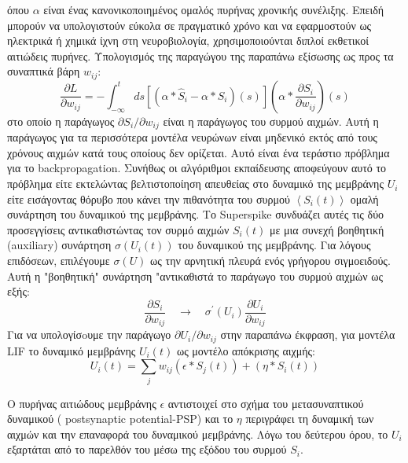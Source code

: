 \documentclass[12pt]{report}
\begin{document}
όπου $\alpha$ είναι ένας κανονικοποιημένος ομαλός πυρήνας χρονικής συνέλιξης. Επειδή μπορούν να υπολογιστούν εύκολα σε πραγματικό χρόνο και να εφαρμοστούν ως ηλεκτρικά ή χημικά ίχνη στη νευροβιολογία, χρησιμοποιούνται διπλοί εκθετικοί αιτιώδεις πυρήνες. Υπολογισμός της παραγώγου της παραπάνω εξίσωσης ως προς τα συναπτικά βάρη $w_{i j}$:
\begin{equation}
\frac{\partial L}{\partial w_{i j}}=-\int_{-\infty}^{t} d s\left[\left(\alpha * \hat{S}_{i}-\alpha * S_{i}\right)(s)\right]\left(\alpha * \frac{\partial S_{i}}{\partial w_{i j}}\right)(s)
\end{equation}
στο οποίο η παράγωγος $\partial S_{i} / \partial w_{i j}$ είναι η παράγωγος του συρμού αιχμών. Αυτή η παράγωγος για τα περισσότερα μοντέλα νευρώνων είναι μηδενικό εκτός από τους χρόνους αιχμών κατά τους οποίους δεν ορίζεται. Αυτό είναι ένα τεράστιο πρόβλημα για το \textlatin{backpropagation}. Συνήθως οι αλγόριθμοι εκπαίδευσης αποφεύγουν αυτό το πρόβλημα είτε εκτελώντας βελτιστοποίηση απευθείας στο δυναμικό της μεμβράνης $U_{i}$ είτε εισάγοντας θόρυβο που κάνει την πιθανότητα του συρμού $\left\langle S_{i}(t)\right\rangle$ ομαλή συνάρτηση του δυναμικού της μεμβράνης. Το \textlatin{Superspike} συνδυάζει αυτές τις δύο προσεγγίσεις αντικαθιστώντας τον συρμό αιχμών $S_{i}(t)$ με μια συνεχή βοηθητική (\textlatin{auxiliary}) συνάρτηση $\sigma\left(U_{i}(t)\right)$  του δυναμικού της μεμβράνης. Για λόγους επιδόσεων, επιλέγουμε $\sigma(U)$ ως την αρνητική πλευρά ενός γρήγορου σιγμοειδούς. Αυτή η "βοηθητική" συνάρτηση "αντικαθιστά το παράγωγο του συρμού αιχμών ως εξής:
\begin{equation}
\frac{\partial S_{i}}{\partial w_{i j}} \quad \rightarrow \quad \sigma^{\prime}\left(U_{i}\right) \frac{\partial U_{i}}{\partial w_{i j}}
\end{equation}
Για να υπολογίσoυμε την παράγωγο $\partial U_{i} / \partial w_{i j}$ στην παραπάνω έκφραση, για μοντέλα \textlatin{LIF} το δυναμικό μεμβράνης  $U_{i}(t)$ ως μοντέλο απόκρισης αιχμής:
\begin{equation}
U_{i}(t)=\sum_{j} w_{i j}\left(\epsilon * S_{j}(t)\right)+\left(\eta * S_{i}(t)\right)
\end{equation}

Ο πυρήνας αιτιώδους μεμβράνης $\epsilon$ αντιστοιχεί στο σχήμα του μετασυναπτικού δυναμικού ( \textlatin{postsynaptic potential}-\textlatin{PSP}) και το $\eta$ περιγράφει τη δυναμική των αιχμών και την επαναφορά του δυναμικού μεμβράνης. Λόγω του δεύτερου όρου, το $U_{i}$ εξαρτάται από το παρελθόν του μέσω της εξόδου του συρμού $S_{i}$.
\end{document}
